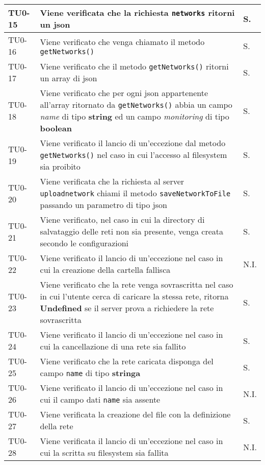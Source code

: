 \begin{longtable}{|C{.15\textwidth}|m{.66\textwidth}|C{.10\textwidth}|}
\hline 
{}TU0-15 & Viene verificata che la richiesta \texttt{networks} ritorni un json & S. \\ 
\hline 
TU0-16 & Viene verificato che venga chiamato il metodo \texttt{getNetworks()} & S. \\
\hline 
{}TU0-17 & Viene verificato che il metodo \texttt{getNetworks()} ritorni un array di json & S. \\ 
\hline
TU0-18 & Viene verificato che per ogni json appartenente all'array ritornato da \texttt{getNetworks()} abbia un campo \textit{name} di tipo \textbf{string} ed un campo \textit{monitoring} di tipo \textbf{boolean} & S. \\ 
\hline
{}TU0-19 & Viene verificato il lancio di un'eccezione dal metodo \texttt{getNetworks()} nel caso in cui l'accesso al filesystem sia proibito & S. \\ 
\hline 
TU0-20 & Viene verificata che la richiesta al server \texttt{uploadnetwork} chiami il metodo \texttt{saveNetworkToFile} passando un parametro di tipo json & S. \\ 
\hline 
{}TU0-21 & Viene verificato, nel caso in cui la directory di salvataggio delle reti non sia presente, venga creata secondo le configurazioni & S. \\ 
\hline 
 TU0-22 & Viene verificato il lancio di un'eccezione nel caso in cui la creazione della cartella fallisca & N.I. \\ 
\hline 
{}TU0-23 & Viene verificato che la rete venga sovrascritta nel caso in cui l'utente cerca di caricare la stessa rete, ritorna \textbf{Undefined} se il server prova a richiedere la rete sovrascritta & S. \\
\hline
TU0-24 & Viene verificato il lancio di un'eccezione nel caso in cui la cancellazione di una rete sia fallito & S. \\ 
\hline
{}TU0-25 & Viene verificato che la rete caricata disponga del campo \texttt{name} di tipo \textbf{stringa} & S. \\ 
\hline 
 TU0-26 & Viene verificato il lancio di un'eccezione nel caso in cui il campo dati \texttt{name} sia assente & N.I. \\ 
\hline 
{}TU0-27	 & Viene verificata la creazione del file con la definizione della rete & S. \\ 
\hline 
 TU0-28 & Viene verificata il lancio di un'eccezione nel caso in cui la scritta su filesystem sia fallita & N.I. \\ 

\end{longtable}
